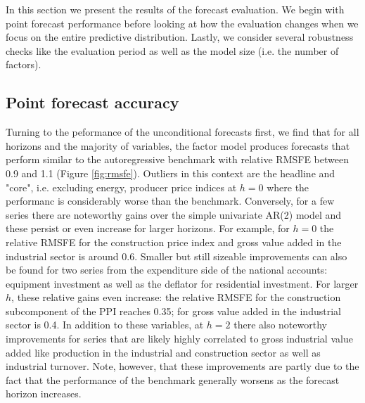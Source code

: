 \documentclass[notitlepage,a4paper,12pt]{article}
\begin{document}
In this section we present the results of the forecast evaluation. We begin with point forecast performance before looking at how the evaluation changes when we focus on the entire predictive distribution. Lastly, we consider several robustness checks like the evaluation period as well as the model size (i.e. the number of factors). 

\subsection{Point forecast accuracy}

Turning to the peformance of the unconditional forecasts first, we find that for all horizons and the majority of variables, the factor model produces forecasts that perform similar to the autoregressive benchmark with relative RMSFE between 0.9 and 1.1 (Figure \ref{fig:rmsfe}). Outliers in this context are the headline and "core", i.e. excluding energy, producer price indices at $h=0$ where the performanc is considerably worse than the benchmark. Conversely, for a few series there are noteworthy gains over the simple univariate AR(2) model and these persist or even increase for larger horizons. For example, for $h=0$ the relative RMSFE for the construction price index and gross value added in the industrial sector is around 0.6. Smaller but still sizeable improvements can also be found for two series from the expenditure side of the national accounts: equipment investment as well as the deflator for residential investment. For larger $h$, these relative gains even increase: the relative RMSFE for the construction subcomponent of the PPI reaches 0.35; for gross value added in the industrial sector is 0.4. In addition to these variables, at $h=2$ there also noteworthy improvements for series that are likely highly correlated to gross industrial value added like production in the industrial and construction sector as well as industrial turnover. Note, however, that these improvements are partly due to the fact that the performance of the benchmark generally worsens as the forecast horizon increases.
\end{document}
